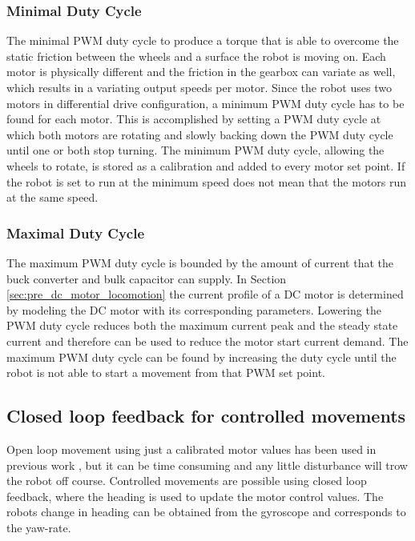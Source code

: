 \subsubsection{Minimal Duty Cycle}

The minimal PWM duty cycle to produce a torque that is able to overcome the static friction between the wheels and a surface the robot is moving on.
Each motor is physically different and the friction in the gearbox can variate as well, which results in a variating output speeds per motor.
Since the robot uses two motors in differential drive configuration, a minimum PWM duty cycle has to be found for each motor.
This is accomplished by setting a PWM duty cycle at which both motors are rotating and slowly backing down the PWM duty cycle until one or both stop turning.
The minimum PWM duty cycle, allowing the wheels to rotate, is stored as a calibration and added to every motor set point.
If the robot is set to run at the minimum speed does not mean that the motors run at the same speed.


\subsubsection{Maximal Duty Cycle}

The maximum PWM duty cycle is bounded by the amount of current that the buck converter and bulk capacitor can supply.
In Section \ref{sec:pre_dc_motor_locomotion} the current profile of a DC motor is determined by modeling the DC motor with its corresponding parameters.
Lowering the PWM duty cycle reduces both the maximum current peak and the steady state current and therefore can be used to reduce the motor start current demand.
The maximum PWM duty cycle can be found by increasing the duty cycle until the robot is not able to start a movement from that PWM set point.


\subsection{Closed loop feedback for controlled movements}

Open loop movement using just a calibrated motor values has been used in previous work \cite{legoc_uist_2016}, but it can be time consuming and any little disturbance will trow the robot off course.
Controlled movements are possible using closed loop feedback, where the heading is used to update the motor control values.
The robots change in heading can be obtained from the gyroscope and corresponds to the yaw-rate.

